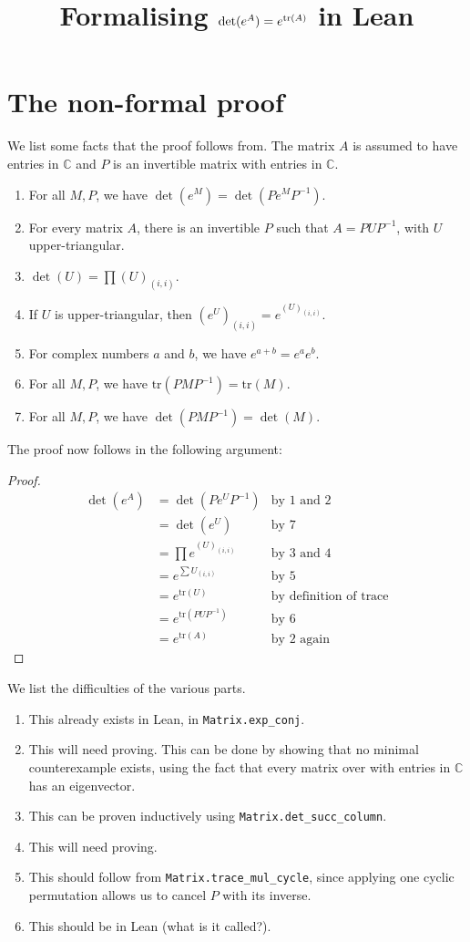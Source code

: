 \documentclass[12pt,reqno, a4paper]{amsart}
\title{Formalising $\det(e^A) = e^{\tr(A)}$ in Lean}
\author{}
\date{}
\numberwithin{equation}{section}
\theoremstyle{definition}
\newcommand{\tr}{\mathrm{tr}}
\newcommand{\C}{\mathbb{C}}
\begin{document}
\maketitle

\section{The non-formal proof}

We list some facts that the proof follows from. The matrix $A$ is assumed to have entries in $\C$ and $P$ is an invertible matrix with entries in $\C$. 

\begin{enumerate}
	\item For all $M,P$, we have $\det(e^M) = \det(Pe^MP^{-1})$.
	\item For every matrix $A$, there is an invertible $P$ such that $A = PUP^{-1}$, with $U$ upper-triangular.
	\item $\det(U) = \prod (U)_{(i,i)}$.
	\item If $U$ is upper-triangular, then $(e^U)_{(i,i)} = e^{(U)_{(i,i)}}$. 
	\item For complex numbers $a$ and $b$, we have $e^{a+b} = e^a e^b$.
	\item For all $M,P$, we have $\tr(PMP^{-1}) = \tr(M)$.
	\item For all $M, P$, we have $\det(PMP^{-1}) = \det(M)$. 
\end{enumerate}

The proof now follows in the following argument: 
\begin{proof}
	\begin{align*}
		\det(e^A) & = \det(Pe^UP^{-1}) & \text{by 1 and 2} \\ 
		& = \det(e^U) & \text{by 7} \\
		& = \prod e^{(U)_{(i,i)}} & \text{by 3 and 4} \\
		& = e^{\sum U_{(i,i)}} & \text{by 5} \\
		& = e^{\tr(U)} & \text{by definition of trace} \\ 
		& = e^{\tr(PUP^{-1})} & \text{by 6} \\ 
		& = e^{\tr(A)} & \text{by 2 again}
	\end{align*}
\end{proof}

We list the difficulties of the various parts. 

\begin{enumerate}
	\item This already exists in Lean, in \texttt{Matrix.exp\_conj}.
	\item This will need proving. This can be done by showing that no minimal counterexample exists, using the fact that every matrix over with entries in $\C$ has an eigenvector.
	\item This can be proven inductively using \texttt{Matrix.det\_succ\_column}.
	\item This will need proving.
	\item This should follow from \texttt{Matrix.trace\_mul\_cycle}, since applying one cyclic permutation allows us to cancel $P$ with its inverse.
	\item This should be in Lean (what is it called?).
\end{enumerate}
\end{document}
